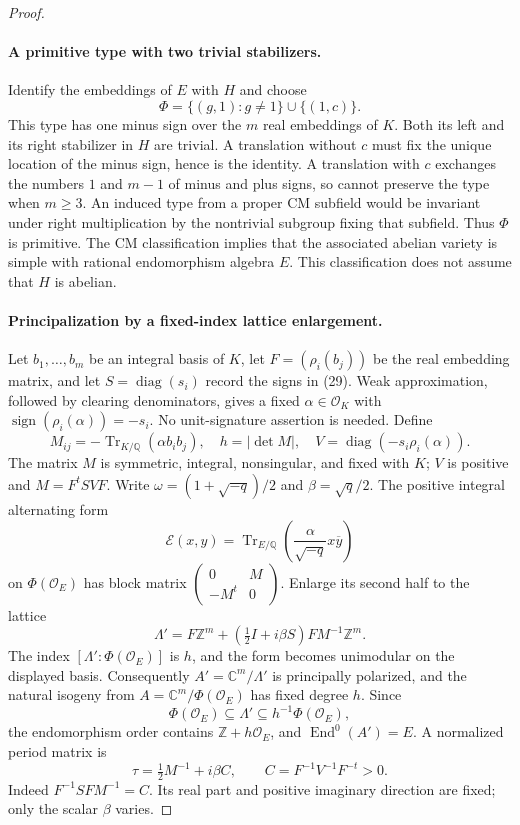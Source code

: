 \documentclass[11pt]{article}
\theoremstyle{definition}
\theoremstyle{remark}
\begin{document}
\begin{proof}
\paragraph{A primitive type with two trivial stabilizers.}
Identify the embeddings of $E$ with $H$ and choose
\[
 \Phi=\{(g,1):g\ne1\}\cup\{(1,c)\}.
\]
This type has one minus sign over the $m$ real embeddings of $K$.
Both its left and its right stabilizer in $H$ are trivial.  A translation
without $c$ must fix the unique location of the minus sign, hence is the
identity.  A translation with $c$ exchanges the numbers $1$ and $m-1$ of
minus and plus signs, so cannot preserve the type when $m\geq3$.
An induced type from a proper CM subfield would be invariant under right
multiplication by the nontrivial subgroup fixing that subfield.  Thus
$\Phi$ is primitive.  The CM classification
\cite[Proposition 2.1, p.~54]{Milne1999} implies that the associated abelian
variety is simple with rational endomorphism algebra $E$.  This classification
does not assume that $H$ is abelian.

\paragraph{Principalization by a fixed-index lattice enlargement.}
Let $b_1,\ldots,b_m$ be an integral basis of $K$, let
$F=(\rho_i(b_j))$ be the real embedding matrix, and let
$S=\operatorname{diag}(s_i)$ record the signs in (29).  Weak approximation,
followed by clearing denominators, gives a fixed $\alpha\in\mathcal O_K$
with $\operatorname{sign}(\rho_i(\alpha))=-s_i$.  No unit-signature assertion
is needed.  Define
\[
 M_{ij}=-\operatorname{Tr}_{K/\mathbb Q}(\alpha b_i b_j),
 \quad h=|\det M|,
 \quad V=\operatorname{diag}(-s_i\rho_i(\alpha)).
\]
The matrix $M$ is symmetric, integral, nonsingular, and fixed with $K$;
$V$ is positive and $M=F^tSVF$.  Write
$\omega=(1+\sqrt{-q})/2$ and $\beta=\sqrt q/2$.
The positive integral alternating form
\[
 \mathcal E(x,y)=\operatorname{Tr}_{E/\mathbb Q}
 \left(\frac{\alpha}{\sqrt{-q}}x\overline y\right)
\]
on $\Phi(\mathcal O_E)$ has block matrix
$\left(\begin{smallmatrix}0&M\\-M^t&0\end{smallmatrix}\right)$.
Enlarge its second half to the lattice
\[
 \Lambda'=F\mathbb Z^m+
 \left(\tfrac12 I+i\beta S\right)FM^{-1}\mathbb Z^m.
\]
The index $[\Lambda':\Phi(\mathcal O_E)]$ is $h$, and the form becomes
unimodular on the displayed basis.  Consequently
$A'=\mathbb C^m/\Lambda'$ is principally polarized, and the natural isogeny
from $A=\mathbb C^m/\Phi(\mathcal O_E)$ has fixed degree $h$.  Since
\[
 \Phi(\mathcal O_E)\subseteq\Lambda'
 \subseteq h^{-1}\Phi(\mathcal O_E),
\]
the endomorphism order contains $\mathbb Z+h\mathcal O_E$, and
$\operatorname{End}^0(A')=E$.  A normalized period matrix is
\[
 \tau=\tfrac12 M^{-1}+i\beta C,
 \qquad C=F^{-1}V^{-1}F^{-t}>0.
\]
Indeed $F^{-1}SF M^{-1}=C$.  Its real part and positive imaginary direction
are fixed; only the scalar $\beta$ varies.


\end{proof}
\end{document}
